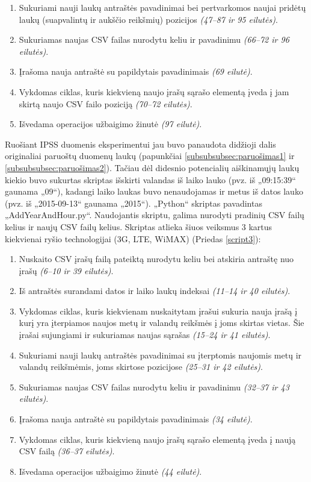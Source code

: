 \documentclass{VUMIFPSbakalaurinis}
\begin{document}
\begin{enumerate}
	\item Sukuriami nauji laukų antraštės pavadinimai bei pertvarkomos naujai pridėtų laukų (suapvalintų ir aukščio reikšmių) pozicijos \textit{(47–87 ir 95 eilutės)}.
	\item Sukuriamas naujas CSV failas nurodytu keliu ir pavadinimu \textit{(66–72 ir 96 eilutės)}.
	\item Įrašoma nauja antraštė su papildytais pavadinimais \textit{(69 eilutė)}.
	\item Vykdomas ciklas, kuris kiekvieną naujo įrašų sąrašo elementą įveda į jam skirtą naujo CSV failo poziciją \textit{(70–72 eilutės)}.
	\item Išvedama operacijos užbaigimo žinutė \textit{(97 eilutė)}.
\end{enumerate}

 \label{subsubsubsec:paruošimas3}
Ruošiant IPSS duomenis eksperimentui jau buvo panaudota didžioji dalis originaliai paruoštų duomenų laukų (papunkčiai \ref{subsubsubsec:paruošimas1} ir \ref{subsubsubsec:paruošimas2}). Tačiau dėl didesnio potencialių aiškinamųjų laukų kiekio buvo sukurtas skriptas išskirti valandas iš laiko lauko (pvz. iš „09:15:39“ gaunama „09“), kadangi laiko laukas buvo nenaudojamas ir metus iš datos lauko (pvz. iš „2015-09-13“ gaunama „2015“). „Python“ skriptas pavadintas „AddYearAndHour.py“. Naudojantis skriptu, galima nurodyti pradinių CSV failų kelius ir naujų CSV failų kelius. Skriptas atlieka šiuos veiksmus 3 kartus kiekvienai ryšio technologijai (3G, LTE, WiMAX) (Priedas \ref{script3}):
\begin{enumerate}
	\item Nuskaito CSV įrašų failą pateiktą nurodytu keliu bei atskiria antraštę nuo įrašų \textit{(6–10 ir 39 eilutės)}. 
	\item Iš antraštės surandami datos ir laiko laukų indeksai \textit{(11–14 ir 40 eilutės)}.
	\item Vykdomas ciklas, kuris kiekvienam nuskaitytam įrašui sukuria nauja įrašą į kurį yra įterpiamos naujos metų ir valandų reikšmės į joms skirtas vietas. Šie įrašai sujungiami ir sukuriamas naujas sąrašas \textit{(15–24 ir 41 eilutės)}.
	\item Sukuriami nauji laukų antraštės pavadinimai su įterptomis naujomis metų ir valandų reikšmėmis, joms skirtose pozicijose \textit{(25–31 ir 42 eilutės)}.
	\item Sukuriamas naujas CSV failas nurodytu keliu ir pavadinimu \textit{(32–37 ir 43 eilutės)}.
	\item Įrašoma nauja antraštė su papildytais pavadinimais \textit{(34 eilutė)}.
	\item Vykdomas ciklas, kuris kiekvieną naujo įrašų sąrašo elementą įveda į naują CSV failą \textit{(36–37 eilutės)}.
	\item Išvedama operacijos užbaigimo žinutė \textit{(44 eilutė)}.
\end{enumerate}
\end{document}
